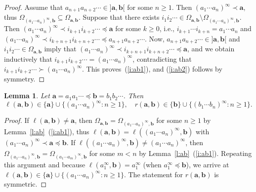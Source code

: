 \documentclass{amsart}
\newtheorem{lemma}[theorem]{Lemma}
\theoremstyle{definition}
\numberwithin{equation}{section}
\newcommand{\ba}{\mathbf{a}}
\newcommand{\bb}{\mathbf{b}}
\begin{document}
\begin{proof} 
Assume that $a_{n+1}a_{n+2}\cdots \in {]\ba,\bb[}$ for some $n \ge 1$.
Then $(a_1\cdots a_n)^\infty \prec \ba$, thus $\Omega_{(a_1\cdots a_n)^\infty,\bb} \subseteq \Omega_{\ba,\bb}$.
Suppose that there exists $i_1i_2\cdots \in \Omega_{\ba,\bb} \setminus \Omega_{(a_1\cdots a_n)^\infty,\bb}$.
Then $(a_1\cdots a_n)^\infty\prec i_{k+1}i_{k+2}\cdots \preceq \ba$ for some $k \ge 0$, i.e., $i_{k+1}\cdots i_{k+n} = a_1\cdots a_n$ and $(a_1\cdots a_n)^\infty\prec i_{k+n+1}i_{k+n+2}\cdots \preceq a_{n+1}a_{n+2}\cdots$. 
Now, $a_{n+1}a_{n+2}\cdots \in {]\ba,\bb[}$ and $i_1i_2\cdots \in
\Omega_{\ba,\bb}$ imply that $(a_1\cdots a_n)^\infty\prec i_{k+n+1}i_{k+n+2} \cdots \preceq \ba$, and we obtain inductively that $i_{k+1}i_{k+2}\cdots = (a_1\cdots a_n)^\infty$, contradicting that $i_{k+1}i_{k+2}\cdots \succ (a_1\cdots a_n)^\infty$.
This proves~(\ref{i:ab1}), and (\ref{i:ab2}) follows by symmetry.
\end{proof}

\begin{lemma} \label{l:charab}
Let $\ba = a_1a_1\cdots \preceq \bb = b_1b_2\cdots$.
Then
\[
\ell(\ba,\bb) \in \{\ba\} \cup \{(a_1\cdots a_n)^\infty : n \ge 1\},\quad r(\ba,\bb) \in \{\bb\} \cup \{(b_1\cdots b_n)^\infty : n \ge 1\}.
\]
\end{lemma}

\begin{proof}
If $\ell(\ba,\bb) \ne \ba$, then $\Omega_{\ba,\bb} = \Omega_{(a_1\cdots a_n)^\infty,\bb}$ for some $n \ge 1$ by Lemma~\ref{l:ab}~(\ref{i:ab1}), thus $\ell(\ba,\bb) = \ell((a_1\cdots a_n)^\infty,\bb)$ with $(a_1\cdots a_n)^\infty \prec \ba \preceq \bb$.
If $\ell((a_1\cdots a_n)^\infty,\bb) \ne (a_1\cdots a_n)^\infty$, then  $\Omega_{(a_1\cdots a_n)^\infty,\bb} = \Omega_{(a_1\cdots a_m)^\infty,\bb}$ for some $m < n$ by Lemma~\ref{l:ab}~(\ref{i:ab1}).
Repeating this argument and because $\ell(a_1^\infty,\bb) = a_1^\infty$ (when $a_1^\infty \preceq \bb$), we arrive at $\ell(\ba,\bb) \in \{\ba\} \cup \{(a_1\cdots a_n)^\infty : n \ge 1\}$.
The statement for $r(\ba,\bb)$ is symmetric.
\end{proof}
\end{document}
